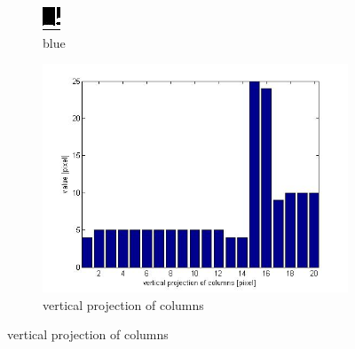 \begin{figure}[htbp]
\begin{subfigure}[t]{0.1\textwidth}
        \includegraphics[width=\textwidth]{2b.jpg}
        \caption{blue}
  \end{subfigure}
    \begin{subfigure}[c]{0.4\textwidth}
        \includegraphics[width=\textwidth]{2c.jpg}
        \caption{vertical projection of columns}
  \end{subfigure}
  

\end{figure}
